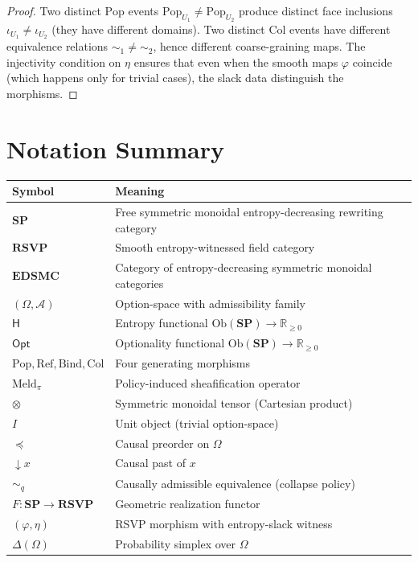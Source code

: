 \documentclass[12pt,a4paper]{article}
\theoremstyle{definition}
\theoremstyle{remark}
\newcommand{\Rnn}{\mathbb{R}_{\ge 0}}
\newcommand{\Ent}{\ensuremath{\mathsf{H}}}
\newcommand{\Opt}{\ensuremath{\mathsf{Opt}}}
\newcommand{\SP}{\mathbf{SP}}
\newcommand{\RSVP}{\mathbf{RSVP}}
\newcommand{\EDSMC}{\mathbf{EDSMC}}
\newcommand{\Ob}{\mathrm{Ob}}
\newcommand{\Pop}{\ensuremath{\mathrm{Pop}}}
\newcommand{\RefOp}{\ensuremath{\mathrm{Ref}}}
\newcommand{\Bind}{\ensuremath{\mathrm{Bind}}}
\newcommand{\Col}{\ensuremath{\mathrm{Col}}}
\newcommand{\Meld}{\mathrm{Meld}}
\newcommand{\tensor}{\otimes}
\newcommand{\unit}{I}
\newcommand{\downset}[1]{\!\downarrow\!{#1}}
\begin{document}
\begin{proof}
Two distinct $\Pop$ events $\Pop_{U_1}\ne\Pop_{U_2}$ produce distinct face inclusions
$\iota_{U_1}\ne\iota_{U_2}$ (they have different domains). Two distinct $\Col$ events
have different equivalence relations $\sim_1\ne\sim_2$, hence different coarse-graining
maps. The injectivity condition on $\eta$ ensures that even when the smooth maps $\varphi$
coincide (which happens only for trivial cases), the slack data distinguish the morphisms.
\end{proof}

\section{Notation Summary}
\label{app:notation}

\begin{center}
\renewcommand{\arraystretch}{1.4}
\begin{tabular}{ll}
\toprule
\textbf{Symbol} & \textbf{Meaning} \\
\midrule
$\SP$ & Free symmetric monoidal entropy-decreasing rewriting category \\
$\RSVP$ & Smooth entropy-witnessed field category \\
$\EDSMC$ & Category of entropy-decreasing symmetric monoidal categories \\
$(\Omega,\mathcal{A})$ & Option-space with admissibility family \\
$\Ent$ & Entropy functional $\Ob(\SP)\to\Rnn$ \\
$\Opt$ & Optionality functional $\Ob(\SP)\to\Rnn$ \\
$\Pop,\RefOp,\Bind,\Col$ & Four generating morphisms \\
$\Meld_\pi$ & Policy-induced sheafification operator \\
$\tensor$ & Symmetric monoidal tensor (Cartesian product) \\
$\unit$ & Unit object (trivial option-space) \\
$\preceq$ & Causal preorder on $\Omega$ \\
$\downset{x}$ & Causal past of $x$ \\
$\sim_q$ & Causally admissible equivalence (collapse policy) \\
$F:\SP\to\RSVP$ & Geometric realization functor \\
$(\varphi,\eta)$ & RSVP morphism with entropy-slack witness \\
$\Delta(\Omega)$ & Probability simplex over $\Omega$ \\

\end{tabular}
\end{center}
\end{document}
